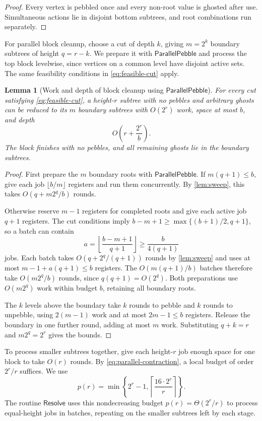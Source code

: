 \documentclass[11pt]{article}
\newtheorem{lemma}[lemma]{Lemma}
\theoremstyle{definition}
\theoremstyle{remark}
\newcommand{\Sweep}{\mathsf{ParallelPebble}}
\newcommand{\Resolve}{\mathsf{Resolve}}
\begin{document}
\begin{proof}
Every vertex is pebbled once and every non-root value is ghosted
after use. Simultaneous actions lie in disjoint bottom subtrees,
and root combinations run separately.
\end{proof}

For parallel block cleanup, choose a cut of depth $k$, giving $m=2^k$ boundary subtrees of height $q=r-k$. We prepare it with $\Sweep$ and process the top block levelwise, since vertices on a common level have disjoint active sets. The same feasibility conditions in \cref{eq:feasible-cut} apply.

\begin{lemma}[Work and depth of block cleanup using $\Sweep$]
\label{cor:parallel-contraction}
For every cut satisfying \cref{eq:feasible-cut}, a height-$r$ subtree with no pebbles and arbitrary ghosts can be reduced to its $m$ boundary subtrees with $O(2^r)$ work, space at most $b$, and depth
\begin{equation}
O\!\left(r+\frac{2^r}{b}\right).
\label{eq:parallel-contraction}
\end{equation}
The block finishes with no pebbles, and all remaining ghosts lie in the boundary subtrees.
\end{lemma}
\begin{proof}
First prepare the $m$ boundary roots with $\Sweep$.
If $m(q+1)\le b$, give each job $\lfloor b/m\rfloor$ registers
and run them concurrently. By \cref{lem:sweep}, this takes
$O(q+m2^q/b)$ rounds.

Otherwise reserve $m-1$ registers for completed roots and give each
active job $q+1$ registers. The cut conditions imply
$b-m+1\ge\max\{(b+1)/2,q+1\}$, so a batch can contain
\[
a=\left\lfloor\frac{b-m+1}{q+1}\right\rfloor\ge\frac{b}{4(q+1)}
\]
jobs. Each batch takes $O(q+2^q/(q+1))$ rounds by \cref{lem:sweep}
and uses at most $m-1+a(q+1)\le b$ registers. The $O(m(q+1)/b)$
batches therefore take $O(m2^q/b)$ rounds, since $q(q+1)=O(2^q)$.
Both preparations use $O(m2^q)$ work within budget $b$, retaining all
boundary roots.

The $k$ levels above the boundary take $k$ rounds to pebble and
$k$ rounds to unpebble, using $2(m-1)$ work and at most $2m-1\le b$
registers. Release the boundary in one further round, adding at most
$m$ work. Substituting $q+k=r$ and $m2^q=2^r$ gives the bounds.
\end{proof}

To process smaller subtrees together, give each height-$r$ job enough space for one block to take $O(r)$ rounds. By \cref{eq:parallel-contraction}, a local budget of order $2^r/r$ suffices. We use
\begin{equation}
p(r)=\min\left\{2^r-1,\left\lceil\frac{16\cdot2^r}{r}\right\rceil\right\}.
\label{eq:resolver-space}
\end{equation}
The routine $\Resolve$ uses this nondecreasing budget $p(r)=\Theta(2^r/r)$ to process equal-height jobs in batches, repeating on the smaller subtrees left by each stage.
\end{document}
